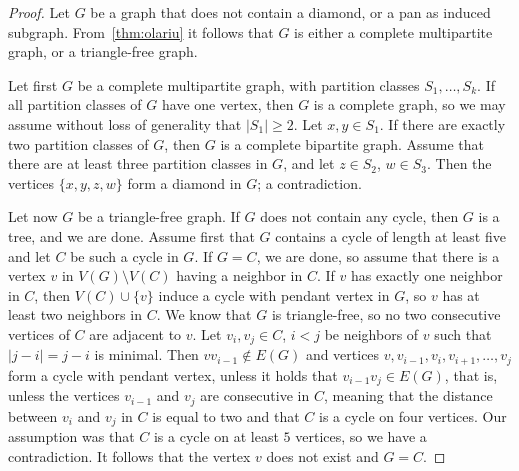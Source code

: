 \documentclass{svproc}
\begin{document}
\begin{proof}
Let $G$ be a graph that does not contain a diamond, or a pan as induced subgraph. From~\cref{thm:olariu} it follows that $G$ is either a complete multipartite graph, or a triangle-free graph. 

Let first $G$ be a complete multipartite graph, with partition classes $S_1,\dots, S_k$. If all partition classes of $G$ have one vertex, then $G$ is a complete graph, so we may assume without loss of generality that $|S_1|\ge 2$. Let $x,y\in S_1$. If there are exactly two partition classes of $G$, then $G$ is a complete bipartite graph. Assume that there are at least three partition classes in $G$, and let $z\in S_2$, $w\in S_3$. Then the vertices $\{x,y,z,w\}$ form a diamond in $G$; a contradiction. 

Let now $G$ be a triangle-free graph. If $G$ does not contain any cycle, then $G$ is a tree, and we are done. 
Assume first that $G$ contains a cycle of length at least five and let $C$ be such a cycle in $G$. If $G=C$, we are done, so assume that there is a vertex $v$ in $V(G)\setminus V(C)$ having a neighbor in $C$. If $v$ has exactly one neighbor in $C$, then $V(C)\cup \{v\}$ induce a cycle with pendant vertex in $G$, so $v$ has at least two neighbors in $C$. We know that $G$ is triangle-free, so no two consecutive vertices of $C$ are adjacent to $v$. Let $v_i,v_j\in C$, $i<j$ be neighbors of $v$ such that $|j-i|=j-i$ is minimal. Then $vv_{i-1}\notin E(G)$ and vertices $v, v_{i-1}, v_i,v_{i+1},\dots, v_j$ form a cycle with pendant vertex, unless it holds that $v_{i-1}v_j\in E(G)$, that is, unless the vertices $v_{i-1}$ and $v_j $ are consecutive in $C$, meaning that the distance between $v_i$ and $v_j$ in $C$ is equal to two and that $C$ is a cycle on four vertices. Our assumption was that $C$ is a cycle on at least $5$ vertices, so we have a contradiction. It follows that the vertex $v$ does not exist and $G=C$.


\end{proof}
\end{document}
